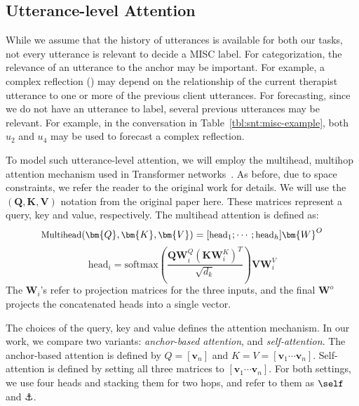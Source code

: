 \subsection{Utterance-level Attention}
\label{ssec:sentence_att}
While we assume that the history of utterances is available for both
our tasks, not every utterance is relevant to decide a MISC label.
%
For categorization, the relevance of an utterance to the anchor may
be important. For example, a complex reflection (\REC) may depend on
the relationship of the current therapist utterance to one or more
of the previous client utterances. For forecasting, since we do not
have an utterance to label, several previous utterances may
be relevant. For example, in the conversation in
Table~\ref{tbl:snt:misc-example}, both $u_2$ and $u_4$ may be used to
forecast a complex reflection.

To model such utterance-level attention, we will employ the
multihead, multihop attention mechanism used in Transformer
networks~\cite{NIPS2017_7181}. As before, due to space constraints,
we refer the reader to the original work for details. We will use
the $(\bm{Q}, \bm{K}, \bm{V})$ notation from the original paper
here. These matrices represent a query, key and value,
respectively. The multihead attention is defined as:
%
\begin{equation}
\label{eq:multihead_attention}
{\small \text{Multihead}(\bm{Q},\bm{K},\bm{V}) = [\text{head}_{1};\cdots; \text{head}_{h}]\bm{W}^{O}}
\end{equation}
\begin{equation}
 \text{head}_{i} = \text{softmax}\left(\frac{\bm{Q}\bm{W}^{Q}_{i}\left(\bm{K}\bm{W}^{K}_{i}\right)^T}{\sqrt{d_{k}}}\right)\bm{V}\bm{W}^{V}_{i}
\end{equation}
The $\bm{W}_i$'s refer to projection matrices for the three inputs,
and the final $\bm{W}^o$ projects the concatenated heads into a
single vector.

The choices of the query, key and value defines the attention
mechanism. In our work, we compare two variants: {\em anchor-based
  attention}, and {\em self-attention}. The anchor-based attention
is defined by $Q = [\bm{v}_{n}]$ and
$K=V=[\bm{v}_{1} \cdots \bm{v}_{n}]$.  Self-attention is defined by
setting all three matrices to $[\bm{v}_{1} \cdots \bm{v}_{n}]$.
%
For both settings, we use four heads and stacking them for two hops,
and refer to them as $\self$ and $\anchor$.


